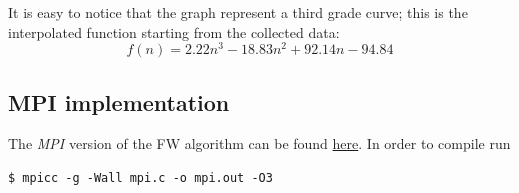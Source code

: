 \documentclass[twocolumns]{IEEEtran}
\begin{document}
It is easy to notice that the graph represent a 
third grade curve; this is the interpolated function starting from the collected data:
\[f(n) = 2.22n^3 - 18.83n^2 + 92.14n -94.84 \]



\subsection{MPI implementation}

The \emph{MPI} version of the FW algorithm can be found \href{https://github.com/firaja/Parallel-FloydWarshall/blob/master/mpi.c}{here}. In order to compile run
\begin{lstlisting}
$ mpicc -g -Wall mpi.c -o mpi.out -O3
\end{lstlisting}








\end{document}
